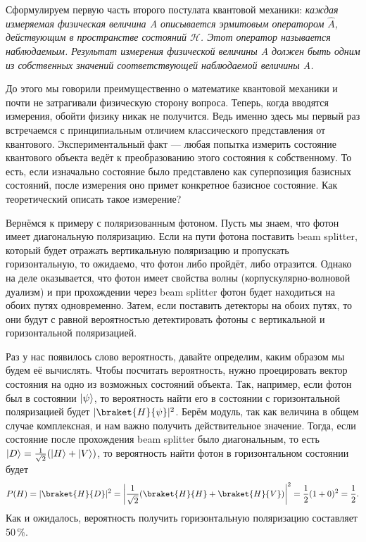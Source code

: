 Сформулируем первую часть второго постулата квантовой механики: \textit{каждая
  измеряемая физическая величина A описывается эрмитовым оператором $\hat{A}$,
  действующим в пространстве состояний $\mathcal{H}$. Этот оператор называется
  наблюдаемым. Результат измерения физической величины A должен быть одним из
  собственных значений соответствующей наблюдаемой величины A.}

До этого мы говорили преимущественно о математике квантовой механики и почти не
затрагивали физическую сторону вопроса. Теперь, когда вводятся измерения,
обойти физику никак не получится. Ведь именно здесь мы первый раз встречаемся с
принципиальным отличием классического представления от квантового.
Экспериментальный факт — любая попытка измерить состояние квантового объекта
ведёт к преобразованию этого состояния к собственному. То есть, если изначально
состояние было представлено как суперпозиция базисных состояний, после
измерения оно примет конкретное базисное состояние. Как теоретический описать
такое измерение?

Вернёмся к примеру с поляризованным фотоном. Пусть мы знаем, что фотон имеет
диагональную поляризацию. Если на пути фотона поставить beam splitter, который
будет отражать вертикальную поляризацию и пропускать горизонтальную, то
ожидаемо, что фотон либо пройдёт, либо отразится. Однако на деле оказывается,
что фотон имеет свойства волны (корпускулярно-волновой дуализм) и при
прохождении через beam splitter фотон будет находиться на обоих путях
одновременно. Затем, если поставить детекторы на обоих путях, то они будут с
равной вероятностью детектировать фотоны с вертикальной и горизонтальной
поляризацией.

Раз у нас появилось слово вероятность, давайте определим, каким образом мы
будем её вычислять. Чтобы посчитать вероятность, нужно проецировать вектор
состояния на одно из возможных состояний объекта. Так, например, если фотон был
в состоянии $\lvert\psi\rangle$, то вероятность найти его в состоянии с горизонтальной
поляризацией будет $|\braket{H}{\psi}|^2$. Берём модуль, так как величина в
общем случае комплексная, и нам важно получить действительное значение. Тогда,
если состояние после прохождения beam splitter было диагональным, то есть
$\lvert D\rangle = \frac{1}{\sqrt{2}}(\lvert H\rangle + \lvert V\rangle)$, то вероятность найти фотон в
горизонтальном состоянии будет
\[
  P(H) = |\braket{H}{D}|^2 = \left|\frac{1}{\sqrt{2}} (\braket{H}{H}
  + \braket{H}{V})\right|^2 = \frac{1}{2}(1 + 0)^2 = \frac{1}{2}.
\]
Как и ожидалось, вероятность получить горизонтальную поляризацию составляет
50\,\%.


